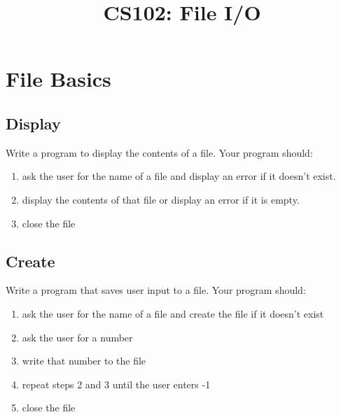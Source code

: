 \documentclass{article}
\begin{document}
\title{CS102: File I/O}

\maketitle

\section{File Basics}
\subsection{Display}
Write a program to display the contents of a file. Your program should:
\begin{enumerate}
	\item ask the user for the name of a file and display an error if it doesn't exist.
	\item display the contents of that file or display an error if it is empty.
	\item close the file
\end{enumerate}

\subsection{Create}
Write a program that saves user input to a file. Your program should:
\begin{enumerate}
	\item ask the user for the name of a file and create the file if it doesn't exist
	\item ask the user for a number
	\item write that number to the file
	\item repeat steps 2 and 3 until the user enters -1
	\item close the file
\end{enumerate}
\end{document}
